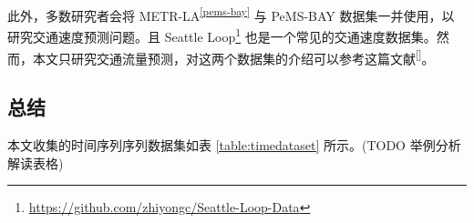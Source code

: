 \documentclass{ctexart}
\renewcommand{\cite}[1]{\textsuperscript{[\citenum{#1}]}}
\begin{document}
此外，多数研究者会将 METR-LA\textsuperscript{\ref{pems-bay}} 与 PeMS-BAY 数据集一并使用，以研究交通速度预测问题。且 Seattle Loop\footnote{\url{https://github.com/zhiyongc/Seattle-Loop-Data}} 也是一个常见的交通速度数据集。然而，本文只研究交通流量预测，对这两个数据集的介绍可以参考这篇文献\cite{T-ZS2}。


\subsection{总结}
本文收集的时间序列序列数据集如表 \ref{table:timedataset} 所示。(TODO 举例分析解读表格)
\end{document}
